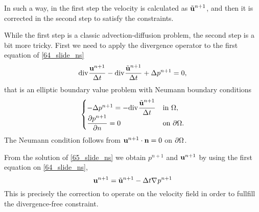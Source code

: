 In such a way, in the first step the velocity is calculated as \(\tilde{\textbf{u}}^{n+1}\), and then it is corrected in the second step to satisfy the constraints.

While the first step is a classic advection-diffusion problem, the second step is a bit more tricky. First we need to apply the divergence operator to the first equation of \eqref{64_slide_ns}
\[
    \text{div}\mspace{1mu}\frac{\textbf{u}^{n+1}}{\Delta t} -\text{div}\mspace{1mu} \frac{\tilde{\textbf{u}}^{n+1}}{\Delta t} + \Delta p^{n+1} = 0,
\]
that is an elliptic boundary value problem with Neumann boundary conditions 
\begin{equation}
    \begin{cases}
        -\Delta p^{n+1} = -\div \dfrac{\tilde{\uvec}^{n+1}}{\tstep} & \txt{in }\Omega, \\
        \displaystyle\partialderivative{p^{n+1}}{n} = 0 & \txt{on }\boundary.
    \end{cases}
    \label{65_slide_ns}
\end{equation}
The Neumann condition follows from \(\textbf{u}^{n+1}\cdot \textbf{n} = 0\) on \({\partial\Omega}\).

From the solution of \eqref{65_slide_ns} we obtain \(p^{n+1}\) and \(\textbf{u}^{n+1}\) by using the first equation on \eqref{64_slide_ns}, 
\begin{equation}
    \textbf{u}^{n+1} = \tilde{\textbf{u}}^{n+1} - \Delta t \nabla\mspace{1mu} p^{n+1}
    \label{66_slide_ns}
\end{equation}
This is precisely the correction to operate on the velocity field in order to fullfill the divergence-free constraint. 

